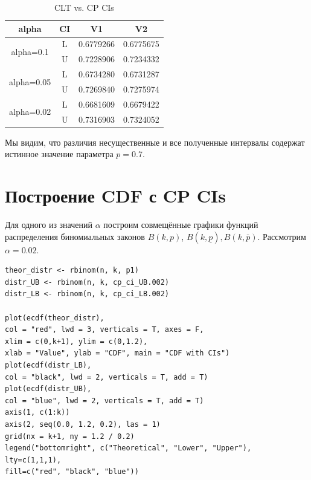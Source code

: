 \documentclass[14pt,a4paper]{scrartcl}
\begin{document}
\begin{table}[htbp]
	\centering
	\caption{CLT vs. CP CIs}
	\begin{tabular}{|c|c|c|c|}
		\hline
		alpha & CI    & V1    & V2 \bigstrut\\
		\hline
		\multirow{2}[4]{*}{alpha=0.1} & L     & 0.6779266 & 0.6775675 \bigstrut\\
		\cline{2-4}          & U     & 0.7228906 & 0.7234332 \bigstrut\\
		\hline
		\multirow{2}[4]{*}{alpha=0.05} & L     & 0.6734280 & 0.6731287 \bigstrut\\
		\cline{2-4}          & U     & 0.7269840 & 0.7275974 \bigstrut\\
		\hline
		\multirow{2}[4]{*}{alpha=0.02} & L     & 0.6681609 & 0.6679422 \bigstrut\\
		\cline{2-4}          & U     & 0.7316903 & 0.7324052 \bigstrut\\
		\hline
	\end{tabular}%
	\label{tab:addlabel}%
\end{table}%


Мы видим, что различия несущественные и все полученные интервалы содержат истинное значение параметра $p=0.7$.

\section{Построение CDF с CP CIs}
Для одного из значений $\alpha$ построим совмещённые графики функций распределения биномиальных законов $B(k,p)$, $B(k,\underline{p}), B(k,\bar{p})$. Рассмотрим $\alpha = 0.02$.
\begin{verbatim}
theor_distr <- rbinom(n, k, p1)
distr_UB <- rbinom(n, k, cp_ci_UB.002)
distr_LB <- rbinom(n, k, cp_ci_LB.002)

plot(ecdf(theor_distr), 
col = "red", lwd = 3, verticals = T, axes = F,
xlim = c(0,k+1), ylim = c(0,1.2),
xlab = "Value", ylab = "CDF", main = "CDF with CIs")
plot(ecdf(distr_LB), 
col = "black", lwd = 2, verticals = T, add = T)
plot(ecdf(distr_UB), 
col = "blue", lwd = 2, verticals = T, add = T)
axis(1, c(1:k))
axis(2, seq(0.0, 1.2, 0.2), las = 1)
grid(nx = k+1, ny = 1.2 / 0.2)
legend("bottomright", c("Theoretical", "Lower", "Upper"), 
lty=c(1,1,1), 
fill=c("red", "black", "blue"))
\end{verbatim}

\begin{figure}[h]
\end{figure}
\end{document}
